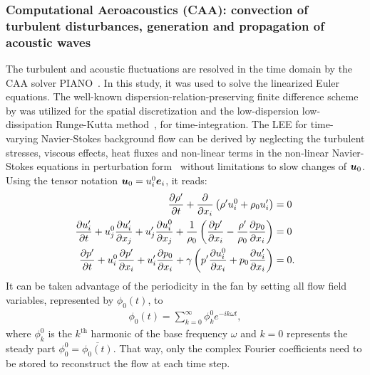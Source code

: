 \subsubsection{Computational Aeroacoustics (CAA): convection of turbulent disturbances, generation and propagation of acoustic waves }
The turbulent and acoustic fluctuations are resolved in the time domain by the CAA solver PIANO~\cite{delfs_numerical_2008}. In this study, it was used to solve the linearized Euler equations. The well-known dispersion-relation-preserving finite difference scheme by \citet{tam_dispersion-relation-preserving_1993} was utilized for the spatial discretization and the low-dispersion low-dissipation Runge-Kutta method~\cite{hu_low-dissipation_1996}, for time-integration. 
The LEE for time-varying Navier-Stokes background flow can be derived by neglecting the turbulent stresses, viscous effects, heat fluxes and non-linear terms in the non-linear Navier-Stokes equations in perturbation form~\cite{ewert_linear-_2014} without limitations to slow changes of ${\boldsymbol{u}}_0$. Using the tensor notation ${\boldsymbol{u}}_0 = u^0_i {\boldsymbol{e}}_i$, it reads:
\begin{subequations}
\begin{align}
\frac{\partial \rho'}{\partial t}  + \frac{\partial }{\partial x_i}\left(\rho'u^0_i+\rho_0 u_i'\right) &= 0\\
\frac{\partial u_i'}{\partial t}+u^0_j\frac{\partial u_i'}{\partial x_j}+u_j'\frac{\partial u^0_i}{\partial x_j}+\frac{1}{\rho_0}\left(\frac{\partial p'}{\partial x_i}-\frac{\rho'}{\rho_0}\frac{\partial p_0}{\partial x_i}\right)&=0\\
\frac{\partial p'}{\partial t}+u^0_i\frac{\partial p'}{\partial x_i}+ u_i'\frac{\partial p_0}{\partial x_i}+\gamma\left(p'\frac{\partial u^0_i}{\partial x_i}+p_0\frac{\partial u_i'}{\partial x_i}\right)&=0.
\end{align}
\end{subequations}
It can be taken advantage of the periodicity in the fan by setting all flow field variables, represented by $\phi_0(t)$, to 
\begin{align}\label{eq:fourierCoeff4CAA}
\phi_0(t) = \sum\limits_{k = 0}^{\infty}\phi^0_{k} e^{-i k \omega t},
\end{align}
where $\phi^0_{k}$ is the $k^\text{th}$ harmonic of the base frequency $\omega$ and $k = 0$ represents the steady part $\phi^0_0 = \overline{ \phi_0(t)}$. That way, only the complex Fourier coefficients need to be stored to reconstruct the flow at each time step.

